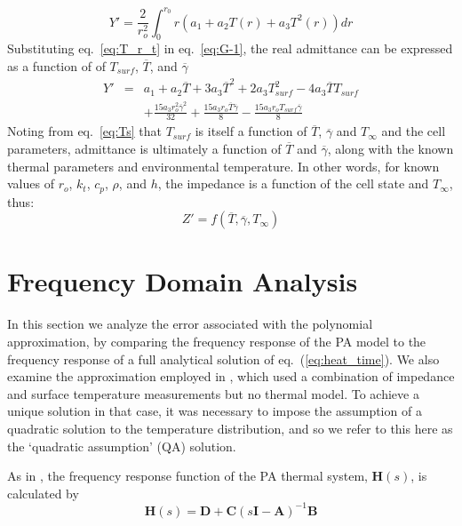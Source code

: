 \documentclass[journal, english]{IEEEtran}
\begin{document}
\begin{equation}
Y'=\frac{2}{r_{o}^{2}}\int_{0}^{r_{0}}r\left(a_{1}+a_{2}T(r)+a_{3}T^{2}(r)\right)dr\label{eq:G-1}
\end{equation}
Substituting eq.\ \ref{eq:T_r_t} in eq.\ \ref{eq:G-1}, the real admittance
can be expressed as a function of of $T_{surf}$, $\overline{T}$,
and $\overline{\gamma}$
\begin{equation}
\begin{aligned}Y' & = & a_{1}+a_{2}\overline{T}+3a_{3}\overline{T}^{2}+2a_{3}T_{surf}^{2}-4a_{3}\overline{T}T_{surf}\\
 &  & +\frac{15a_{3}r_{o}^{2}\overline{\gamma}^{2}}{32}+\frac{15a_{3}r_{o}\overline{T}\overline{\gamma}}{8}-\frac{15a_{3}r_{o}T_{surf}\overline{\gamma}}{8}
\end{aligned}
\label{eq:G<->Tbar/gamma}
\end{equation}
Noting from eq.\ \ref{eq:Ts} that $T_{surf}$ is itself a function
of $\overline{T}$, $\overline{\gamma}$ and $T_{\infty}$ and the
cell parameters, admittance is ultimately a function of $\overline{T}$ and $\overline{\gamma}$,
along with the known thermal parameters and environmental temperature.
In other words, for known values of $r_{o}$, $k_{t}$,
$c_{p}$, $\rho$, and $h$, the impedance is a function of the cell
state and $T_{\infty}$, thus: 
\begin{equation}
Z'=f(\overline{T},\overline{\gamma},T_{\infty})\label{eq:f}
\end{equation}

\section{Frequency Domain Analysis\label{sec:Frequency-Domain-Analysis}}
In this section we analyze the error associated with the polynomial approximation, by comparing the frequency response of the PA model to the frequency response of a full analytical solution of eq.\ (\ref{eq:heat_time}). We also examine the approximation employed in \cite{Richardson2014}, which used a combination
of impedance and surface temperature measurements but no thermal model.
To achieve a unique solution in that case, it was necessary to impose the assumption of 
a quadratic solution to the temperature distribution, and so
we refer to this here as the `quadratic assumption' (QA) solution. 

As in \cite{Kim2013}, the frequency response function of the PA thermal
system, $\mathbf{H}(s)$, is calculated by
\begin{equation}
\mathbf{H}(s)=\mathbf{D}+\mathbf{C}(s\mathbf{I}-\mathbf{A})^{-1}\mathbf{B}
\end{equation}
\end{document}
